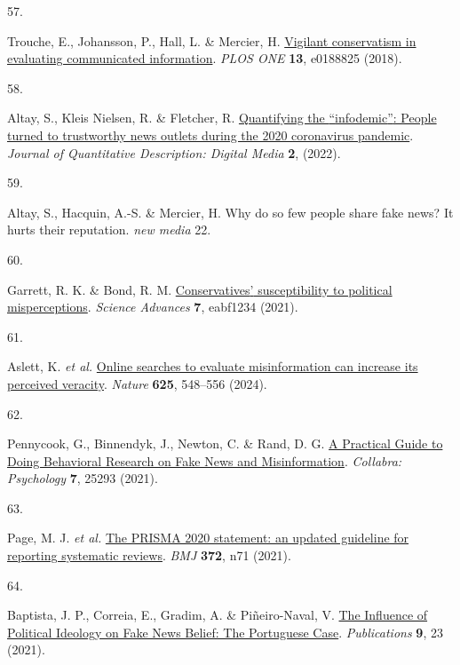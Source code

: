 \documentclass[
  doc,floatsintext]{apa6}
\newlength{\cslhangindent}
\newlength{\csllabelwidth}
\newenvironment{CSLReferences}[2] %
 {\begin{list}{}{%
  \setlength{\itemindent}{0pt}
  \setlength{\leftmargin}{0pt}
  \setlength{\parsep}{0pt}
  \ifodd #1
   \setlength{\leftmargin}{\cslhangindent}
   \setlength{\itemindent}{-1\cslhangindent}
  \fi
  \setlength{\itemsep}{#2\baselineskip}}}
 {\end{list}}
\newcommand{\CSLLeftMargin}[1]{\parbox[t]{\csllabelwidth}{\strut#1\strut}}
\newcommand{\CSLRightInline}[1]{\parbox[t]{\linewidth - \csllabelwidth}{\strut#1\strut}}
\begin{document}
\begin{CSLReferences}{0}{0}
\CSLLeftMargin{57. }%
\CSLRightInline{Trouche, E., Johansson, P., Hall, L. \& Mercier, H. \href{https://doi.org/10.1371/journal.pone.0188825}{Vigilant conservatism in evaluating communicated information}. \emph{PLOS ONE} \textbf{13}, e0188825 (2018).}

\CSLLeftMargin{58. }%
\CSLRightInline{Altay, S., Kleis Nielsen, R. \& Fletcher, R. \href{https://doi.org/10.51685/jqd.2022.020}{Quantifying the {``}infodemic{''}: People turned to trustworthy news outlets during the 2020 coronavirus pandemic}. \emph{Journal of Quantitative Description: Digital Media} \textbf{2}, (2022).}

\CSLLeftMargin{59. }%
\CSLRightInline{Altay, S., Hacquin, A.-S. \& Mercier, H. Why do so few people share fake news? It hurts their reputation. \emph{new media} 22.}

\CSLLeftMargin{60. }%
\CSLRightInline{Garrett, R. K. \& Bond, R. M. \href{https://doi.org/10.1126/sciadv.abf1234}{Conservatives{'} susceptibility to political misperceptions}. \emph{Science Advances} \textbf{7}, eabf1234 (2021).}

\CSLLeftMargin{61. }%
\CSLRightInline{Aslett, K. \emph{et al.} \href{https://doi.org/10.1038/s41586-023-06883-y}{Online searches to evaluate misinformation can increase its perceived veracity}. \emph{Nature} \textbf{625}, 548--556 (2024).}

\CSLLeftMargin{62. }%
\CSLRightInline{Pennycook, G., Binnendyk, J., Newton, C. \& Rand, D. G. \href{https://doi.org/10.1525/collabra.25293}{A Practical Guide to Doing Behavioral Research on Fake News and Misinformation}. \emph{Collabra: Psychology} \textbf{7}, 25293 (2021).}

\CSLLeftMargin{63. }%
\CSLRightInline{Page, M. J. \emph{et al.} \href{https://doi.org/10.1136/bmj.n71}{The PRISMA 2020 statement: an updated guideline for reporting systematic reviews}. \emph{BMJ} \textbf{372}, n71 (2021).}

\CSLLeftMargin{64. }%
\CSLRightInline{Baptista, J. P., Correia, E., Gradim, A. \& Piñeiro-Naval, V. \href{https://doi.org/10.3390/publications9020023}{The Influence of Political Ideology on Fake News Belief: The Portuguese Case}. \emph{Publications} \textbf{9}, 23 (2021).}


\end{CSLReferences}
\end{document}

